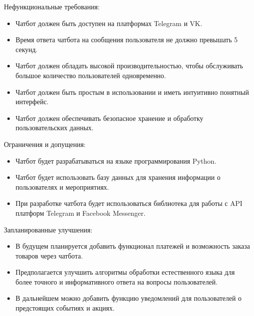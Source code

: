\documentclass[letterpaper,10pt,russian]{sphinxmanual}
\begin{document}
 Нефункциональные требования:
\begin{itemize}
\item {} 
\sphinxAtStartPar
Чат\sphinxhyphen{}бот должен быть доступен на платформах Telegram и VK.

\item {} 
\sphinxAtStartPar
Время ответа чат\sphinxhyphen{}бота на сообщения пользователя не должно превышать 5 секунд.

\item {} 
\sphinxAtStartPar
Чат\sphinxhyphen{}бот должен обладать высокой производительностью, чтобы обслуживать большое количество пользователей одновременно.

\item {} 
\sphinxAtStartPar
Чат\sphinxhyphen{}бот должен быть простым в использовании и иметь интуитивно понятный интерфейс.

\item {} 
\sphinxAtStartPar
Чат\sphinxhyphen{}бот должен обеспечивать безопасное хранение и обработку пользовательских данных.

\end{itemize}

 Ограничения и допущения:
\begin{itemize}
\item {} 
\sphinxAtStartPar
Чат\sphinxhyphen{}бот будет разрабатываться на языке программирования Python.

\item {} 
\sphinxAtStartPar
Чат\sphinxhyphen{}бот будет использовать базу данных для хранения информации о пользователях и мероприятиях.

\item {} 
\sphinxAtStartPar
При разработке чат\sphinxhyphen{}бота будет использоваться библиотека для работы с API платформ Telegram и Facebook Messenger.

\end{itemize}

 Запланированные улучшения:
\begin{itemize}
\item {} 
\sphinxAtStartPar
В будущем планируется добавить функционал платежей и возможность заказа товаров через чат\sphinxhyphen{}бота.

\item {} 
\sphinxAtStartPar
Предполагается улучшить алгоритмы обработки естественного языка для более точного и информативного ответа на вопросы пользователей.

\item {} 
\sphinxAtStartPar
В дальнейшем можно добавить функцию уведомлений для пользователей о предстоящих событиях и акциях.

\end{itemize}
\end{document}
